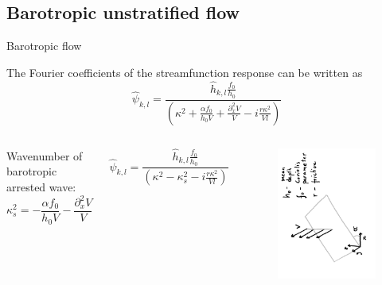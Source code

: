 \documentclass{beamer}
\newcommand{\pdd}[1]{\partial_{#1}^2}
\begin{document}
\subsection{Barotropic unstratified flow}
\begin{frame}{Barotropic flow}

The Fourier coefficients of the streamfunction response can be written as
\begin{equation*}
    \hat{\psi}_{k,l} = \frac{ \hat{h}_{k,l}\frac{f_0}{h_0}}{\left( \kappa^2 + \frac{\alpha f_0}{h_0V} + \frac{\pdd{x}V}{V} - i \frac{r\kappa^2}{Vl}\right)}
\end{equation*}
\begin{columns}
Wavenumber of barotropic arrested wave:
\begin{equation*}
    \kappa_{s}^2 = - \frac{\alpha f_0}{h_0V} - \frac{\pdd{x}V}{V} 
\end{equation*}

\begin{equation*}
    \hat{\psi}_{k,l} = \frac{\hat{h}_{k,l}\frac{f_0}{h_0}}{\left( \kappa^2 - \kappa_{s}^2 - i \frac{r\kappa^2}{Vl}\right)}
\end{equation*}
\begin{figure}
    \centering
    \includegraphics[angle=-90,origin=c,width=\linewidth]
    {figures/barotropic_parameters.pdf}
\end{figure}


\end{columns}
\end{frame}
\end{document}
